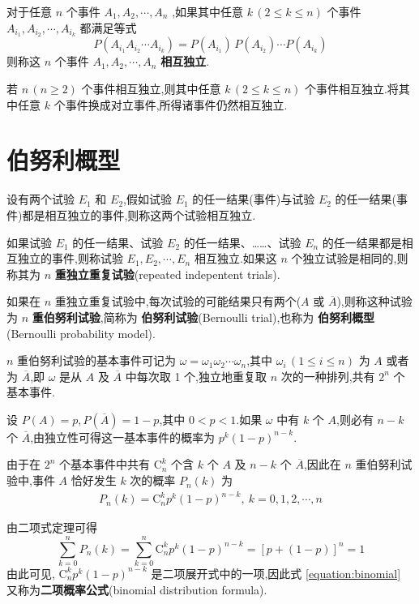 \begin{definition}
    \indent 对于任意 $n$ 个事件 $A_1,A_2,\cdots,A_n$ ,如果其中任意 $k\,(2\leqslant k\leqslant n)$ 个事件 $A_{i_1},A_{i_2},\cdots,A_{i_k}$ 都满足等式
    $$
    P(A_{i_1} A_{i_2} \cdots A_{i_k}) = P(A_{i_1}) \, P(A_{i_2}) \cdots P(A_{i_k})
    $$
    则称这 $n$ 个事件 $A_1,A_2,\cdots,A_n$ \textbf{相互独立}.
\end{definition}

\begin{conclusion}
    \indent 若 $n\, (n \geqslant 2)$ 个事件相互独立,则其中任意 $k\, (2 \leqslant k \leqslant n)$ 个事件相互独立.将其中任意 $k$ 个事件换成对立事件,所得诸事件仍然相互独立.
\end{conclusion}

\section{伯努利概型}

\begin{definition}
    \indent 设有两个试验 $E_1$ 和 $E_2$,假如试验 $E_1$ 的任一结果(事件)与试验 $E_2$ 的任一结果(事件)都是相互独立的事件,则称这两个试验相互独立.
\end{definition}

\begin{definition}
    \indent 如果试验 $E_1$ 的任一结果、试验 $E_2$ 的任一结果、……、试验 $E_n$ 的任一结果都是相互独立的事件,则称试验 $E_1, E_2, \cdots, E_n$ 相互独立.如果这 $n$ 个独立试验是相同的,则称其为 $n$ \textbf{重独立重复试验}(repeated indepentent trials).
\end{definition}

\begin{definition}
    \indent 如果在 $n$ 重独立重复试验中,每次试验的可能结果只有两个($A$ 或 $\overline{A}$),则称这种试验为 $n$ \textbf{重伯努利试验},简称为 \textbf{伯努利试验}(Bernoulli trial),也称为 \textbf{伯努利概型}(Bernoulli probability model).
\end{definition}

$n$ 重伯努利试验的基本事件可记为 $\omega=\omega_1 \omega_2 \cdots \omega_n$,其中 $\omega_i\,(1\leqslant i\leqslant n)$ 为 $A$ 或者为 $\overline{A}$,即 $\omega$ 是从 $A$ 及 $\overline{A}$ 中每次取 1 个,独立地重复取 $n$ 次的一种排列,共有 $2^n$ 个基本事件.

设 $P(A)=p, P(\overline{A}) = 1-p$,其中 $0<p<1$.如果 $\omega$ 中有 $k$ 个 $A$,则必有 $n-k$ 个 $\overline{A}$,由独立性可得这一基本事件的概率为 $p^k (1-p)^{n-k}$.

由于在 $2^n$ 个基本事件中共有 $\mathrm{C}_n^k$ 个含 $k$ 个 $A$ 及 $n-k$ 个 $\overline{A}$,因此在 $n$ 重伯努利试验中,事件 $A$ 恰好发生 $k$ 次的概率 $P_n(k)$ 为
\begin{gather} \label{equation:binomial}
    P_n(k)=\mathrm{C}_n^k p^k (1-p)^{n-k}, \ k=0,1,2,\cdots,n
\end{gather}

由二项式定理可得
$$
\sum_{k=0}^n P_n(k) = \sum_{k=0}^n \mathrm{C}_n^k p^k (1-p)^{n-k} = [p+(1-p)]^n = 1
$$
由此可见, $\mathrm{C}_n^k p^k (1-p)^{n-k}$ 是二项展开式中的一项,因此式 \eqref{equation:binomial} 又称为\textbf{二项概率公式}(binomial distribution formula).